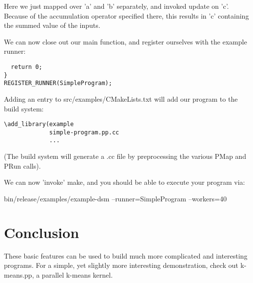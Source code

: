 \documentclass[10pt]{article}
\begin{document}
Here we just mapped over 'a' and 'b' separately, and invoked update on 'c'. 
Because of the accumulation operator specified there, this results in 'c'
containing the summed value of the inputs.

We can now close out our main function, and register ourselves with the example
runner:

\begin{lstlisting}
  return 0;
}
REGISTER_RUNNER(SimpleProgram);
\end{lstlisting}

Adding an entry to src/examples/CMakeLists.txt will add our program to the build
system:
\begin{lstlisting}
\add_library(example 
             simple-program.pp.cc
             ...
\end{lstlisting}

(The build system will generate a .cc file by preprocessing the various PMap and
PRun calls).

We can now 'invoke' make, and you should be able to execute your program via:

{\ttfamily  bin/release/examples/example-dsm --runner=SimpleProgram --workers=40}


\section{Conclusion}
These basic features can be used to build much more complicated and interesting
programs.  For a simple, yet slightly more interesting demonstration, check out
k-means.pp, a parallel k-means kernel.
\end{document}

